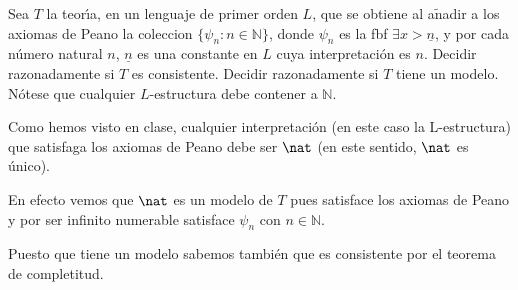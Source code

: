 \documentclass[nochap]{apuntes}
\begin{document}
\begin{problem} Sea $T$ la teor\'{\i}a, 
	en un lenguaje de primer orden  $L$, que se obtiene al a$\operatorname{\tilde{n}}$adir a los
	axiomas de Peano la coleccion $\{ \psi_n: n\in\mathbb{N}\}$, donde
	$\psi_n$ es la fbf $\exists x > \underline{n}$,  y  por cada n\'umero natural $n$,  $ \underline{n}$ es una constante
	en $L$ cuya interpretaci\'on es $n$.
	Decidir razonadamente si 
	$T$ es consistente. Decidir razonadamente si $T$ tiene un modelo. 
	\obs N\'otese que  cualquier
	$L$-estructura debe contener a $\mathbb{N}$.
	\solution
	
	
	Como hemos visto en clase, cualquier interpretación (en este caso la L-estructura) que satisfaga los axiomas de Peano debe ser $\nat$ (en este sentido, $\nat$ es único).
	
	En efecto vemos que $\nat$ es un modelo de $T$ pues satisface los axiomas de Peano y por ser infinito numerable satisface $\psi_n$ con $n\in\mathbb{N}$.
	
	Puesto que tiene un modelo sabemos también que es consistente por el teorema de completitud.
	
\end{problem}
\end{document}
